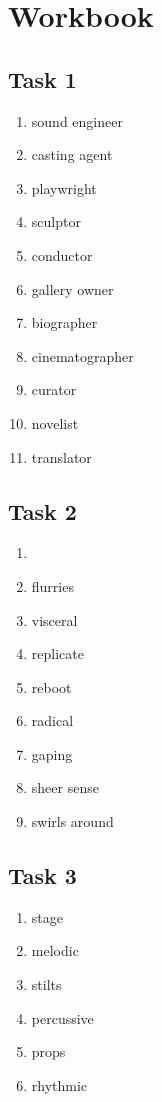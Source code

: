 \documentclass[a4paper]{article}
\begin{document}
\section{Workbook}
\subsection{Task 1}
\begin{enumerate}
    \item sound engineer
    \item casting agent
    \item playwright
    \item sculptor
    \item conductor
    \item gallery owner
    \item biographer
    \item cinematographer
    \item curator
    \item novelist
    \item translator
\end{enumerate}
\subsection{Task 2}
\begin{enumerate}
    \item 
    \item flurries
    \item visceral
    \item replicate
    \item reboot
    \item radical
    \item gaping
    \item sheer sense
    \item swirls around
\end{enumerate}
\subsection{Task 3}
\begin{enumerate}
    \item stage
    \item melodic
    \item stilts
    \item percussive
    \item props
    \item rhythmic
\end{enumerate}
\end{document}

